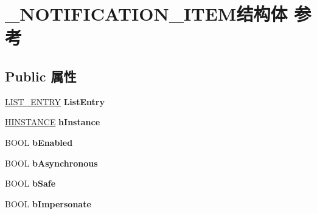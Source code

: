 \hypertarget{struct___n_o_t_i_f_i_c_a_t_i_o_n___i_t_e_m}{}\section{\+\_\+\+N\+O\+T\+I\+F\+I\+C\+A\+T\+I\+O\+N\+\_\+\+I\+T\+E\+M结构体 参考}
\label{struct___n_o_t_i_f_i_c_a_t_i_o_n___i_t_e_m}
\subsection*{Public 属性}
\begin{DoxyCompactItemize}
\item 
\mbox{\label{struct___n_o_t_i_f_i_c_a_t_i_o_n___i_t_e_m_a3c7814e2d511572247db05cab24604a1}} 
\hyperlink{struct___l_i_s_t___e_n_t_r_y}{L\+I\+S\+T\+\_\+\+E\+N\+T\+RY} {\bfseries List\+Entry}
\item 
\mbox{\label{struct___n_o_t_i_f_i_c_a_t_i_o_n___i_t_e_m_abfee486e7972c81cdd85880488a6423f}} 
\hyperlink{interfacevoid}{H\+I\+N\+S\+T\+A\+N\+CE} {\bfseries h\+Instance}
\item 
\mbox{\label{struct___n_o_t_i_f_i_c_a_t_i_o_n___i_t_e_m_a66a73b4ae38e3155afe808ddeee5424d}} 
B\+O\+OL {\bfseries b\+Enabled}
\item 
\mbox{\label{struct___n_o_t_i_f_i_c_a_t_i_o_n___i_t_e_m_a8d44811ff0131f73166029b12c596962}} 
B\+O\+OL {\bfseries b\+Asynchronous}
\item 
\mbox{\label{struct___n_o_t_i_f_i_c_a_t_i_o_n___i_t_e_m_a0ad999a3a595cf524826de668c2a1216}} 
B\+O\+OL {\bfseries b\+Safe}
\item 
\mbox{\label{struct___n_o_t_i_f_i_c_a_t_i_o_n___i_t_e_m_a9cc75fafd94efea4d5c77c36eb207ce7}} 
B\+O\+OL {\bfseries b\+Impersonate}
\item 
\mbox{\label{struct___n_o_t_i_f_i_c_a_t_i_o_n___i_t_e_m_ab37488534b5599b1d7d6b99120878c4d}} 

\end{DoxyCompactItemize}
